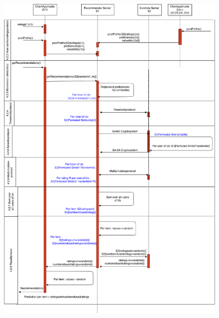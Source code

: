 \begin{center}
\begin{figure}[htpb]   
    \label{Figuur::hoofdprotocoldiagram}      
   
\centering\includegraphics[width=1.0\textwidth,keepaspectratio]{fig/hoofdprotocol_privacy}    
   
   \end{figure}
   \end{center}


